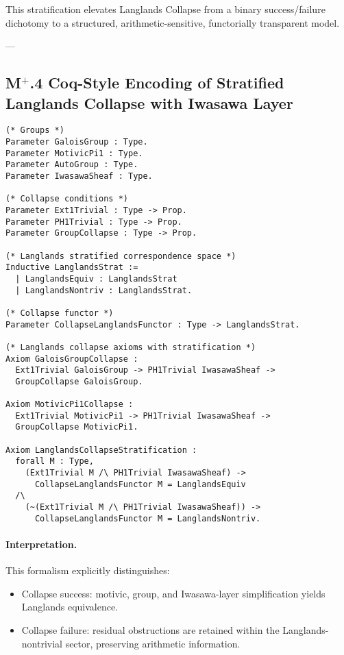 \documentclass[11pt]{article}
\begin{document}
This stratification elevates Langlands Collapse from a binary success/failure dichotomy to a structured, arithmetic-sensitive, functorially transparent model.

---

\subsection*{M$^{+}$.4 Coq-Style Encoding of Stratified Langlands Collapse with Iwasawa Layer}

\begin{lstlisting}[language=Coq]
(* Groups *)
Parameter GaloisGroup : Type.
Parameter MotivicPi1 : Type.
Parameter AutoGroup : Type.
Parameter IwasawaSheaf : Type.

(* Collapse conditions *)
Parameter Ext1Trivial : Type -> Prop.
Parameter PH1Trivial : Type -> Prop.
Parameter GroupCollapse : Type -> Prop.

(* Langlands stratified correspondence space *)
Inductive LanglandsStrat :=
  | LanglandsEquiv : LanglandsStrat
  | LanglandsNontriv : LanglandsStrat.

(* Collapse functor *)
Parameter CollapseLanglandsFunctor : Type -> LanglandsStrat.

(* Langlands collapse axioms with stratification *)
Axiom GaloisGroupCollapse :
  Ext1Trivial GaloisGroup -> PH1Trivial IwasawaSheaf ->
  GroupCollapse GaloisGroup.

Axiom MotivicPi1Collapse :
  Ext1Trivial MotivicPi1 -> PH1Trivial IwasawaSheaf ->
  GroupCollapse MotivicPi1.

Axiom LanglandsCollapseStratification :
  forall M : Type,
    (Ext1Trivial M /\ PH1Trivial IwasawaSheaf) ->
      CollapseLanglandsFunctor M = LanglandsEquiv
  /\
    (~(Ext1Trivial M /\ PH1Trivial IwasawaSheaf)) ->
      CollapseLanglandsFunctor M = LanglandsNontriv.
\end{lstlisting}

\paragraph{Interpretation.}

This formalism explicitly distinguishes:

\begin{itemize}
    \item Collapse success: motivic, group, and Iwasawa-layer simplification yields Langlands equivalence.
    \item Collapse failure: residual obstructions are retained within the Langlands-nontrivial sector, preserving arithmetic information.
\end{itemize}
\end{document}
